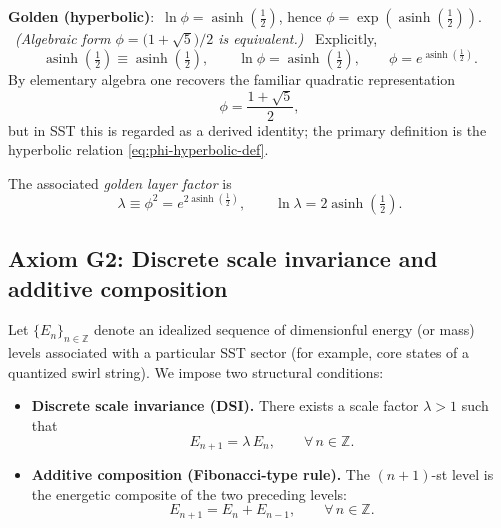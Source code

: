 \documentclass[10pt,reprint,aps,onecolumn,nofootinbib]{revtex4-2}
\newcommand{\xig}{\operatorname{asinh}\!\left(\tfrac{1}{2}\right)}
\newcommand{\phig}{\exp(\xig)}
\newcommand{\phialg}{\bigl(1+\sqrt{5}\bigr)/2}
\newcommand{\GoldenDeclare}{%
    \textbf{Golden (hyperbolic)}:\ \(\ln\phi=\xig\), hence \(\phi=\phig\).
    \ \emph{(Algebraic form \(\phi=\phialg\) is equivalent.)}%
}
\begin{document}
        \GoldenDeclare\ Explicitly,
        \begin{equation}
            \xig \equiv \operatorname{asinh}\!\left(\tfrac{1}{2}\right),
            \qquad
            \ln\phi = \xig,
            \qquad
            \phi = e^{\xig}.
            \label{eq:phi-hyperbolic-def}
        \end{equation}
        By elementary algebra one recovers the familiar quadratic representation
        \begin{equation}
            \phi = \frac{1+\sqrt{5}}{2},
        \end{equation}
        but in SST this is regarded as a derived identity; the primary
        definition is the hyperbolic relation \eqref{eq:phi-hyperbolic-def}.

        The associated \emph{golden layer factor} is
        \begin{equation}
            \lambda \equiv \phi^{2} = e^{2\xig},
            \qquad
            \ln\lambda = 2\xig.
            \label{eq:lambda-def}
        \end{equation}

    \subsection{Axiom G2: Discrete scale invariance and additive composition}

        Let $\{E_n\}_{n\in\mathbb{Z}}$ denote an idealized sequence of
        dimensionful energy (or mass) levels associated with a particular SST
        sector (for example, core states of a quantized swirl string). We
        impose two structural conditions:

        \begin{itemize}
            \item[(G2a)] \textbf{Discrete scale invariance (DSI).} There exists a
            scale factor $\lambda>1$ such that
            \begin{equation}
                E_{n+1} = \lambda\,E_n,
                \qquad
                \forall\,n\in\mathbb{Z}.
                \label{eq:DSI}
            \end{equation}

            \item[(G2b)] \textbf{Additive composition (Fibonacci-type rule).} The
            $(n+1)$-st level is the energetic composite of the two preceding
            levels:
            \begin{equation}
                E_{n+1} = E_n + E_{n-1},
                \qquad
                \forall\,n\in\mathbb{Z}.
                \label{eq:Fibonacci}
            \end{equation}
        \end{itemize}
\end{document}
